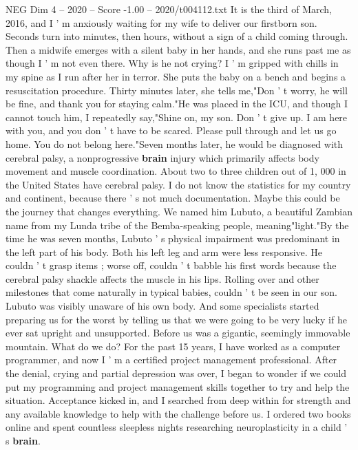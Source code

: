 \begin{textsample}{NEG Dim 4 – 2020 – Score -1.00 – 2020/t004112.txt}  \label{ex:f4_neg_063}
It is the third of March, 2016, and I ' m anxiously waiting for my wife to deliver our firstborn son.
Seconds turn into minutes, then hours, without a sign of a child coming through.
Then a midwife emerges with a silent baby in her hands, and she runs past me as though I ' m not even there.
Why is he not crying?
I ' m gripped with chills in my spine as I run after her in terror.
She puts the baby on a bench and begins a resuscitation procedure.
Thirty minutes later, she tells me,"Don ' t worry, he will be fine, and thank you for staying calm."He was placed in the ICU, and though I cannot touch him, I repeatedly say,"Shine on, my son.
Don ' t give up.
I am here with you, and you don ' t have to be scared.
Please pull through and let us go home.
You do not belong here."Seven months later, he would be diagnosed with cerebral palsy, a nonprogressive \textbf{brain} injury which primarily affects body movement and muscle coordination.
About two to three children out of 1, 000 in the United States have cerebral palsy.
I do not know the statistics for my country and continent, because there ' s not much documentation.
Maybe this could be the journey that changes everything.
We named him Lubuto, a beautiful Zambian name from my Lunda tribe of the Bemba-speaking people, meaning"light."By the time he was seven months, Lubuto ' s physical impairment was predominant in the left part of his body.
Both his left leg and arm were less responsive.
He couldn ' t grasp items ; worse off, couldn ' t babble his first words because the cerebral palsy shackle affects the muscle in his lips.
Rolling over and other milestones that come naturally in typical babies, couldn ' t be seen in our son.
Lubuto was visibly unaware of his own body.
And some specialists started preparing us for the worst by telling us that we were going to be very lucky if he ever sat upright and unsupported.
Before us was a gigantic, seemingly immovable mountain.
What do we do?
For the past 15 years, I have worked as a computer programmer, and now I ' m a certified project management professional.
After the denial, crying and partial depression was over, I began to wonder if we could put my programming and project management skills together to try and help the situation.
Acceptance kicked in, and I searched from deep within for strength and any available knowledge to help with the challenge before us.
I ordered two books online and spent countless sleepless nights researching neuroplasticity in a child ' s \textbf{brain}.

\end{textsample}
